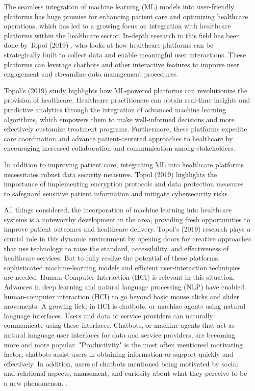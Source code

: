 \documentclass[conference]{IEEEtran}
\begin{document}
   The seamless integration of machine learning (ML) models into user-friendly platforms has huge promise for enhancing patient care and optimizing healthcare operations, which has led to a growing focus on integration with healthcare platforms within the healthcare sector. In-depth research in this field has been done by Topol (2019) \cite{topol2019deep}, who looks at how healthcare platforms can be strategically built to collect data and enable meaningful user interactions. These platforms can leverage chatbots and other interactive features to improve user engagement and streamline data management procedures.

    Topol's (2019) \cite{topol2019deep} study highlights how ML-powered platforms can revolutionize the provision of healthcare. Healthcare practitioners can obtain real-time insights and predictive analytics through the integration of advanced machine learning algorithms, which empowers them to make well-informed decisions and more effectively customize treatment programs. Furthermore, these platforms expedite care coordination and advance patient-centered approaches to healthcare by encouraging increased collaboration and communication among stakeholders.

    In addition to improving patient care, integrating ML into healthcare platforms necessitates robust data security measures. Topol (2019) \cite{topol2019deep} highlights the importance of implementing encryption protocols and data protection measures to safeguard sensitive patient information and mitigate cybersecurity risks.

    All things considered, the incorporation of machine learning into healthcare systems is a noteworthy development in the area, providing fresh opportunities to improve patient outcomes and healthcare delivery. Topol's (2019) \cite{topol2019deep} research plays a crucial role in this dynamic environment by opening doors for creative approaches that use technology to raise the standard, accessibility, and effectiveness of healthcare services. But to fully realize the potential of these platforms, sophisticated machine-learning models and efficient user-interaction techniques are needed. Human-Computer Interaction (HCI) is relevant in this situation.\\
    
    Advances in deep learning and natural language processing (NLP) have enabled human-computer interaction (HCI) to go beyond basic mouse clicks and slider movements. A growing field in HCI is chatbots, or machine agents using natural language interfaces. Users and data or service providers can naturally communicate using these interfaces. Chatbots, or machine agents that act as natural language user interfaces for data and service providers, are becoming more and more popular. "Productivity" is the most often mentioned motivating factor; chatbots assist users in obtaining information or support quickly and effectively. In addition, users of chatbots mentioned being motivated by social and relational aspects, amusement, and curiosity about what they perceive to be a new phenomenon. \cite{folstad2017chatbots}. 
    
\end{document}
